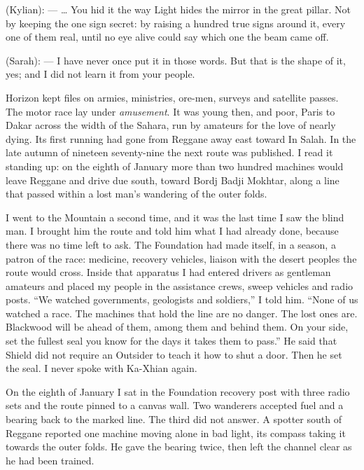 \begin{room}

(Kylian): --- \ldots{} You hid it the way Light hides the mirror in the great pillar. Not by keeping the one sign secret: by raising a hundred true signs around it, every one of them real, until no eye alive could say which one the beam came off.

(Sarah): --- I have never once put it in those words. But that is the shape of it, yes; and I did not learn it from your people.

\end{room}

Horizon kept files on armies, ministries, ore-men, surveys and satellite passes. The motor race lay under \emph{amusement}. It was young then, and poor, Paris to Dakar across the width of the Sahara, run by amateurs for the love of nearly dying. Its first running had gone from Reggane away east toward In Salah. In the late autumn of nineteen seventy-nine the next route was published. I read it standing up: on the eighth of January more than two hundred machines would leave Reggane and drive due south, toward Bordj Badji Mokhtar, along a line that passed within a lost man's wandering of the outer folds.\par

I went to the Mountain a second time, and it was the last time I saw the blind man. I brought him the route and told him what I had already done, because there was no time left to ask. The Foundation had made itself, in a season, a patron of the race: medicine, recovery vehicles, liaison with the desert peoples the route would cross. Inside that apparatus I had entered drivers as gentleman amateurs and placed my people in the assistance crews, sweep vehicles and radio posts. ``We watched governments, geologists and soldiers,'' I told him. ``None of us watched a race. The machines that hold the line are no danger. The lost ones are. Blackwood will be ahead of them, among them and behind them. On your side, set the fullest seal you know for the days it takes them to pass.'' He said that Shield did not require an Outsider to teach it how to shut a door. Then he set the seal. I never spoke with Ka-Xhian again.\par

On the eighth of January I sat in the Foundation recovery post with three radio sets and the route pinned to a canvas wall. Two wanderers accepted fuel and a bearing back to the marked line. The third did not answer. A spotter south of Reggane reported one machine moving alone in bad light, its compass taking it towards the outer folds. He gave the bearing twice, then left the channel clear as he had been trained.\par

